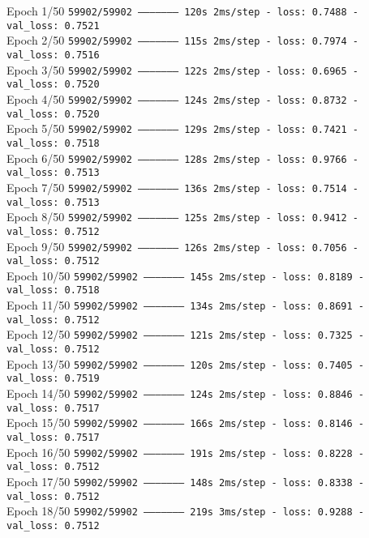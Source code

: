  
Epoch 1/50
\texttt{59902/59902 -------------------- 120s 2ms/step - loss: 0.7488 - val\_loss: 0.7521}\\
Epoch 2/50
\texttt{59902/59902 -------------------- 115s 2ms/step - loss: 0.7974 - val\_loss: 0.7516}\\
Epoch 3/50
\texttt{59902/59902 -------------------- 122s 2ms/step - loss: 0.6965 - val\_loss: 0.7520}\\
Epoch 4/50
\texttt{59902/59902 -------------------- 124s 2ms/step - loss: 0.8732 - val\_loss: 0.7520}\\
Epoch 5/50
\texttt{59902/59902 -------------------- 129s 2ms/step - loss: 0.7421 - val\_loss: 0.7518}\\
Epoch 6/50
\texttt{59902/59902 -------------------- 128s 2ms/step - loss: 0.9766 - val\_loss: 0.7513}\\
Epoch 7/50
\texttt{59902/59902 -------------------- 136s 2ms/step - loss: 0.7514 - val\_loss: 0.7513}\\
Epoch 8/50
\texttt{59902/59902 -------------------- 125s 2ms/step - loss: 0.9412 - val\_loss: 0.7512}\\
Epoch 9/50
\texttt{59902/59902 -------------------- 126s 2ms/step - loss: 0.7056 - val\_loss: 0.7512}\\
Epoch 10/50
\texttt{59902/59902 -------------------- 145s 2ms/step - loss: 0.8189 - val\_loss: 0.7518}\\
Epoch 11/50
\texttt{59902/59902 -------------------- 134s 2ms/step - loss: 0.8691 - val\_loss: 0.7512}\\
Epoch 12/50
\texttt{59902/59902 -------------------- 121s 2ms/step - loss: 0.7325 - val\_loss: 0.7512}\\
Epoch 13/50
\texttt{59902/59902 -------------------- 120s 2ms/step - loss: 0.7405 - val\_loss: 0.7519}\\
Epoch 14/50
\texttt{59902/59902 -------------------- 124s 2ms/step - loss: 0.8846 - val\_loss: 0.7517}\\
Epoch 15/50
\texttt{59902/59902 -------------------- 166s 2ms/step - loss: 0.8146 - val\_loss: 0.7517}\\
Epoch 16/50
\texttt{59902/59902 -------------------- 191s 2ms/step - loss: 0.8228 - val\_loss: 0.7512}\\
Epoch 17/50
\texttt{59902/59902 -------------------- 148s 2ms/step - loss: 0.8338 - val\_loss: 0.7512}\\
Epoch 18/50
\texttt{59902/59902 -------------------- 219s 3ms/step - loss: 0.9288 - val\_loss: 0.7512}\\
